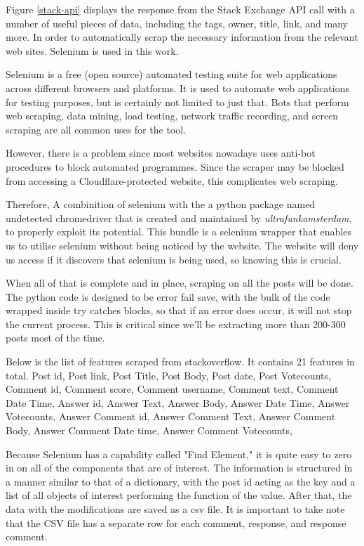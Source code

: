 Figure \ref{stack-api} displays the response from the Stack Exchange API call with a number of useful pieces of data, including the tags, owner, title, link, and many more. In order to automatically scrap the necessary information from the relevant web sites. Selenium is used in this work.

Selenium is a free (open source) automated testing suite for web applications across different browsers and platforms. It is used to automate web applications for testing purposes, but is certainly not limited to just that. Bots that perform web scraping, data mining, load testing, network traffic recording, and screen scraping are all common uses for the tool. 

However, there is a problem since most websites nowadays uses anti-bot procedures to block automated programmes. Since the scraper may be blocked from accessing a Cloudflare-protected website, this complicates web scraping.

Therefore, A combinition of selenium with the a python package named undetected chromedriver that is created and maintained by \emph{ultrafunkamsterdam}, to properly exploit its potential. This bundle is a selenium wrapper that enables us to utilise selenium without being noticed by the website. The website will deny us access if it discovers that selenium is being used, so knowing this is crucial.

When all of that is complete and in place, scraping on all the posts will be done. The python code is designed to be error fail save, with the bulk of the code wrapped inside try catches blocks, so that if an error does occur, it will not stop the current process. This is critical since we'll be extracting more than 200-300 posts most of the time.

Below is the list of features scraped from stackoverflow. It contains 21 features in total.
Post id, 
Post link, 
Post Title,
Post Body,
Post date,
Post Votecounts,
Comment id,
Comment score,
Comment username,
Comment text,
Comment Date Time,
Answer id,
Answer Text,
Answer Body,
Answer Date Time,
Answer Votecounts,
Answer Comment id,
Answer Comment Text,
Answer Comment Body,
Answer Comment Date time,
Answer Comment Votecounts,


Because Selenium has a capability called "Find Element," it is quite easy to zero in on all of the components that are of interest. The information is structured in a manner similar to that of a dictionary, with the post id acting as the key and a list of all objects of interest performing the function of the value. After that, the data with the modifications are saved as a csv file. It is important to take note that the CSV file has a separate row for each comment, response, and response comment. 

